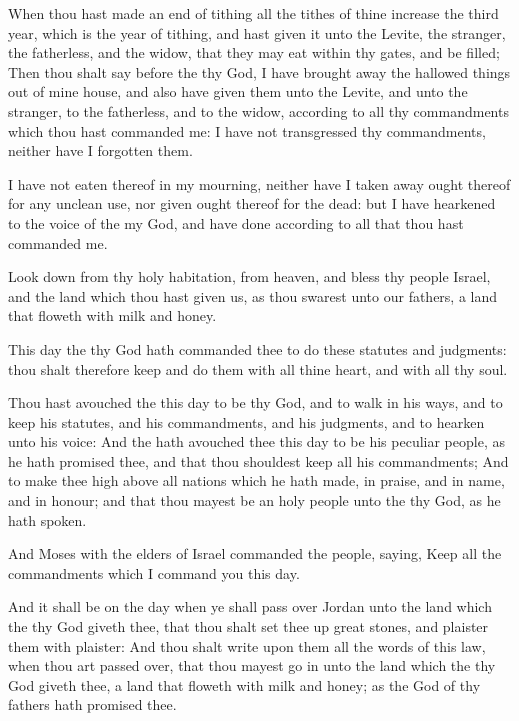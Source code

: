 \Verse When thou hast made an end of tithing all the tithes of thine increase the third year, which is the year of tithing, and hast given it unto the Levite, the stranger, the fatherless, and the widow, that they may eat within thy gates, and be filled; \Verse Then thou shalt say before the \LORD thy God, I have brought away the hallowed things out of mine house, and also have given them unto the Levite, and unto the stranger, to the fatherless, and to the widow, according to all thy commandments which thou hast commanded me: I have not transgressed thy commandments, neither have I forgotten them.

\Verse I have not eaten thereof in my mourning, neither have I taken away ought thereof for any unclean use, nor given ought thereof for the dead: but I have hearkened to the voice of the \LORD my God, and have done according to all that thou hast commanded me.

\Verse Look down from thy holy habitation, from heaven, and bless thy people Israel, and the land which thou hast given us, as thou swarest unto our fathers, a land that floweth with milk and honey.

\Verse This day the \LORD thy God hath commanded thee to do these statutes and judgments: thou shalt therefore keep and do them with all thine heart, and with all thy soul.

\Verse Thou hast avouched the \LORD this day to be thy God, and to walk in his ways, and to keep his statutes, and his commandments, and his judgments, and to hearken unto his voice: \Verse And the \LORD hath avouched thee this day to be his peculiar people, as he hath promised thee, and that thou shouldest keep all his commandments; \Verse And to make thee high above all nations which he hath made, in praise, and in name, and in honour; and that thou mayest be an holy people unto the \LORD thy God, as he hath spoken.


\Chapter
\Verse And Moses with the elders of Israel commanded the people, saying, Keep all the commandments which I command you this day.

\Verse And it shall be on the day when ye shall pass over Jordan unto the land which the \LORD thy God giveth thee, that thou shalt set thee up great stones, and plaister them with plaister: \Verse And thou shalt write upon them all the words of this law, when thou art passed over, that thou mayest go in unto the land which the \LORD thy God giveth thee, a land that floweth with milk and honey; as the \LORD God of thy fathers hath promised thee.

